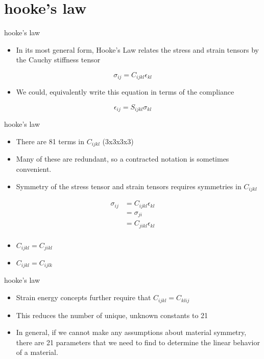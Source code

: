 \documentclass[
  letterpaper,
  ignorenonframetext,
  aspectratio=43,
  handout,
  12pt]{beamer}
\providecommand{\tightlist}{%
  \setlength{\itemsep}{0pt}\setlength{\parskip}{0pt}}
\providecommand{\tightlist}{%
\setlength{\itemsep}{0pt}\setlength{\parskip}{0pt}}
\begin{document}
\hypertarget{hookes-law}{%
\section{hooke's law}\label{hookes-law}}

\begin{frame}{hooke's law}
\protect\hypertarget{hookes-law-1}{}
\begin{itemize}
\tightlist
\item
  In its most general form, Hooke's Law relates the stress and strain
  tensors by the Cauchy stiffness tensor
\end{itemize}

\[\sigma_{ij} = C_{ijkl} \epsilon_{kl}\]

\begin{itemize}
\tightlist
\item
  We could, equivalently write this equation in terms of the compliance
\end{itemize}

\[\epsilon_{ij} = S_{ijkl}\sigma_{kl}\]
\end{frame}

\begin{frame}{hooke's law}
\protect\hypertarget{hookes-law-2}{}
\begin{itemize}
\tightlist
\item
  There are 81 terms in \(C_{ijkl}\) (3x3x3x3)
\item
  Many of these are redundant, so a contracted notation is sometimes
  convenient.
\item
  Symmetry of the stress tensor and strain tensors requires symmetries
  in \(C_{ijkl}\)
\end{itemize}

\[\begin{aligned}
    \sigma_{ij} &= C_{ijkl}\epsilon_{kl}\\
    &= \sigma_{ji}\\
    &= C_{jikl} \epsilon_{kl}\\
\end{aligned}\]

\begin{itemize}
\tightlist
\item
  \(C_{ijkl} = C_{jikl}\)
\item
  \(C_{ijkl} = C_{ijlk}\)
\end{itemize}
\end{frame}

\begin{frame}{hooke's law}
\protect\hypertarget{hookes-law-3}{}
\begin{itemize}
\tightlist
\item
  Strain energy concepts further require that \(C_{ijkl} = C_{klij}\)
\item
  This reduces the number of unique, unknown constants to 21
\item
  In general, if we cannot make any assumptions about material symmetry,
  there are 21 parameters that we need to find to determine the linear
  behavior of a material.
\end{itemize}
\end{frame}
\end{document}
